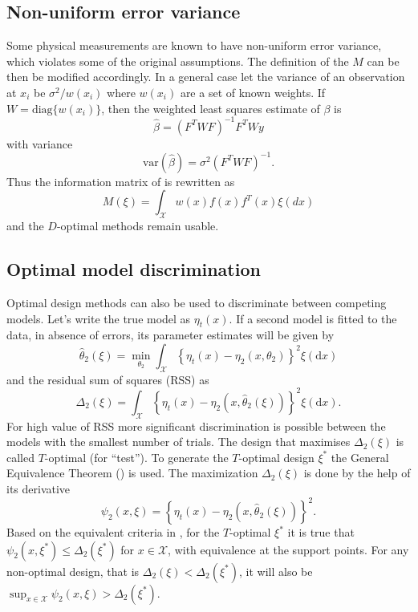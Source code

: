 \documentclass[12pt]{iopart}
\begin{document}
\subsection{Non-uniform error variance}

Some physical measurements are known to have non-uniform error variance, which violates some of the original assumptions. The definition of the $M$ can be then be modified accordingly. In a general case let the variance of an observation at $x_i$ be $\sigma^2/w(x_i)$ where $w(x_i)$ are a set of known weights. If $W = \mathrm{diag}\{w(x_i)\}$, then the weighted least squares estimate of $\beta$ is
\begin{equation}
\hat \beta = (F^T W F)^{-1} F^T W y
\end{equation}
with variance
\begin{equation}
\mathrm{var}(\hat \beta) = \sigma^2 (F^T W F)^{-1}.
\end{equation}
Thus the information matrix of  is rewritten as
\begin{equation}
M(\xi) = \int_{\mathcal{X}} w(x) f(x)f^T(x) \xi(dx)
\end{equation}
and the $D$-optimal methods remain usable.

\subsection{Optimal model discrimination}
\label{sec:modeldiscrimination}

Optimal design methods can also be used to discriminate between competing models. Let's write the true model as $\eta_t(x)$. If a second model is fitted to the data, in absence of errors, its parameter estimates will be given by
\begin{equation}
\hat \theta_2(\xi) = \min_{\theta_2} \int_{\mathcal{X}} \left\{\eta_t(x) - \eta_2(x, \theta_2)\right\}^2 \xi(\mathrm{d}x)
\end{equation}
and the residual sum of squares (RSS) as
\begin{equation}
\Delta_2(\xi) = \int_{\mathcal{X}} \left\{\eta_t(x) - \eta_2(x, \hat \theta_2(\xi))\right\}^2 \xi(\mathrm{d}x).
\label{eq:rss}
\end{equation}
For high value of RSS more significant discrimination is possible between the models with the smallest number of trials. The design that maximises $\Delta_2(\xi)$ is called $T$-optimal (for ``test''). To generate the $T$-optimal design $\xi^*$ the General Equivalence Theorem () is used. The maximization $\Delta_2(\xi)$ is done by the help of its derivative
\begin{equation}
\psi_2(x, \xi) = \left\{\eta_t(x) - \eta_2(x, \hat \theta_2(\xi))\right\}^2.
\end{equation}
Based on the equivalent criteria in , for the $T$-optimal $\xi^*$ it is true that $\psi_2(x, \xi^*) \leq \Delta_2(\xi^*)$ for $x \in \mathcal{X}$, with equivalence at the support points. For any non-optimal design, that is $\Delta_2(\xi) < \Delta_2(\xi^*)$, it will also be $\sup_{x \in \mathcal{X}} \psi_2(x, \xi) > \Delta_2(\xi^*)$.
\end{document}
